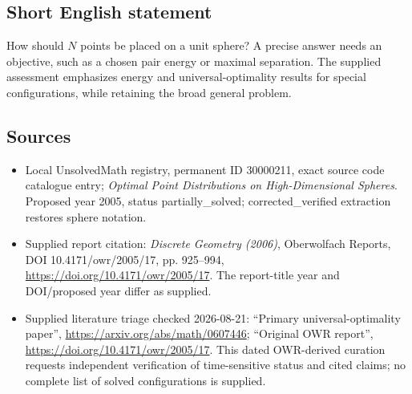\documentclass[11pt]{article}
\begin{document}
\subsection{Short English statement}
How should $N$ points be placed on a unit sphere? A precise answer needs an objective, such as a chosen pair energy or maximal separation. The supplied assessment emphasizes energy and universal-optimality results for special configurations, while retaining the broad general problem.
\subsection{Sources}
\begin{itemize}
\item Local UnsolvedMath registry, permanent ID 30000211, exact source code catalogue entry; \emph{Optimal Point Distributions on High-Dimensional Spheres}. Proposed year 2005, status partially\_solved; corrected\_verified extraction restores sphere notation.
\item Supplied report citation: \emph{Discrete Geometry (2006)}, Oberwolfach Reports, DOI 10.4171/owr/2005/17, pp. 925--994, \url{https://doi.org/10.4171/owr/2005/17}. The report-title year and DOI/proposed year differ as supplied.
\item Supplied literature triage checked 2026-08-21: ``Primary universal-optimality paper'', \url{https://arxiv.org/abs/math/0607446}; ``Original OWR report'', \url{https://doi.org/10.4171/owr/2005/17}. This dated OWR-derived curation requests independent verification of time-sensitive status and cited claims; no complete list of solved configurations is supplied.
\end{itemize}
\end{document}
